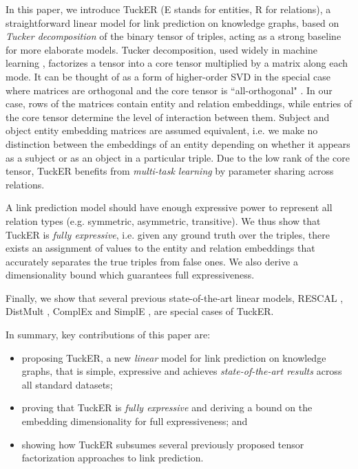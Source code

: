 \documentclass[11pt,a4paper]{article}
\begin{document}
In this paper, we introduce TuckER (E stands for entities, R for relations), a straightforward linear model for link prediction on knowledge graphs, based on \emph{Tucker decomposition} \cite{tucker1966some} of the binary tensor of triples, acting as a strong baseline for more elaborate models. Tucker decomposition, used widely in machine learning \cite{schein2016bayesian, ben2017mutan, yang2017deep}, factorizes a tensor into a core tensor multiplied by a matrix along each mode. It can be thought of as a form of higher-order SVD in the special case where matrices are orthogonal and the core tensor is ``all-orthogonal" \cite{ kroonenberg1980principal}. In our case, rows of the matrices contain entity and relation embeddings, while entries of the core tensor determine the level of interaction between them. Subject and object entity embedding matrices are assumed equivalent, i.e. we make no distinction between the embeddings of an entity depending on whether it appears as a subject or as an object in a particular triple. Due to the low rank of the core tensor, TuckER benefits from \textit{multi-task learning} by parameter sharing across relations.

A link prediction model should have enough expressive power to represent all relation types (e.g. symmetric, asymmetric, transitive). We thus show that TuckER is \textit{fully expressive}, i.e. given any ground truth over the triples, there exists an assignment of values to the entity and relation embeddings that accurately separates the true triples from false ones. We also derive a dimensionality bound which guarantees full expressiveness. 

Finally, we show that several previous state-of-the-art linear models, RESCAL \cite{nickel2011three}, DistMult \cite{yang2014embedding}, ComplEx \cite{trouillon2016complex} and SimplE \cite{kazemi2018simple}, are special cases of TuckER.

In summary, key contributions of this paper are:
\begin{itemize}
    \itemsep-0.2em 
    \item proposing TuckER, a new \emph{linear} model for link prediction on knowledge graphs, that is simple, expressive and achieves \emph{state-of-the-art results} across all standard datasets;
    \item proving that TuckER is \emph{fully expressive} and deriving a bound on the embedding dimensionality for full expressiveness; and
    \item showing how TuckER subsumes several previously proposed tensor factorization approaches to link prediction.
\end{itemize}
\end{document}
